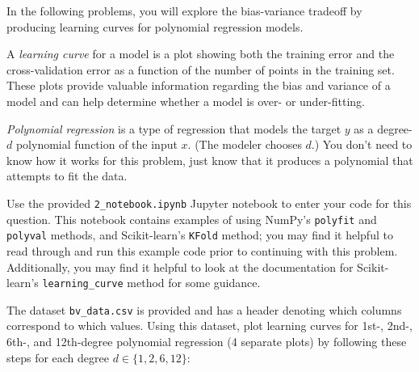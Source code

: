 \begin{problem}[14]
In the following problems, you will explore the bias-variance tradeoff by producing learning curves for polynomial regression models.

A \emph{learning curve} for a model is a plot showing both the training error and the cross-validation error as a function of the number of points in the training set.
These plots provide valuable information regarding the bias and variance of a model and can help determine whether a model is over- or under-fitting.

\emph{Polynomial regression} is a type of regression that models the target $y$ as a degree-$d$ polynomial function of the input $x$.
(The modeler chooses $d$.)
You don't need to know how it works for this problem, just know that it produces a polynomial that attempts to fit the data.

Use the provided \texttt{2_notebook.ipynb} Jupyter notebook to enter your code for this question.
This notebook contains examples of using NumPy's \texttt{polyfit} and \texttt{polyval} methods, and Scikit-learn's \texttt{KFold} method; you may find it helpful to read through and run this example code prior to continuing with this problem.
Additionally, you may find it helpful to look at the documentation for Scikit-learn's \texttt{learning_curve} method for some guidance.

The dataset \texttt{bv_data.csv} is provided and has a header denoting which columns correspond to which values. Using this dataset, plot learning curves for 1st-, 2nd-, 6th-, and 12th-degree polynomial regression (4 separate plots) by following these steps for each degree $d \in \{1, 2, 6, 12\}$:


\end{problem}
